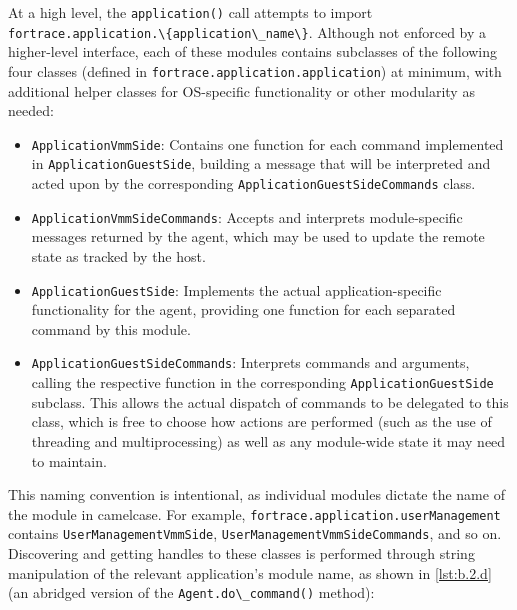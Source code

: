 \documentclass[letterpaper,12pt]{report}
\def\tightlist{}
\newcommand{\passthrough}[1]{#1}
\begin{document}
At a high level, the \passthrough{\lstinline!application()!} call
attempts to import
\passthrough{\lstinline!fortrace.application.\{application\_name\}!}.
Although not enforced by a higher-level interface, each of these modules
contains subclasses of the following four classes (defined in
\passthrough{\lstinline!fortrace.application.application!}) at minimum,
with additional helper classes for OS-specific functionality or other
modularity as needed:

\begin{itemize}
\tightlist
\item
  \passthrough{\lstinline!ApplicationVmmSide!}: Contains one function
  for each command implemented in
  \passthrough{\lstinline!ApplicationGuestSide!}, building a message
  that will be interpreted and acted upon by the corresponding
  \passthrough{\lstinline!ApplicationGuestSideCommands!} class.
\item
  \passthrough{\lstinline!ApplicationVmmSideCommands!}: Accepts and
  interprets module-specific messages returned by the agent, which may
  be used to update the remote state as tracked by the host.
\item
  \passthrough{\lstinline!ApplicationGuestSide!}: Implements the actual
  application-specific functionality for the agent, providing one
  function for each separated command by this module.
\item
  \passthrough{\lstinline!ApplicationGuestSideCommands!}: Interprets
  commands and arguments, calling the respective function in the
  corresponding \passthrough{\lstinline!ApplicationGuestSide!} subclass.
  This allows the actual dispatch of commands to be delegated to this
  class, which is free to choose how actions are performed (such as the
  use of threading and multiprocessing) as well as any module-wide state
  it may need to maintain.
\end{itemize}

This naming convention is intentional, as individual modules dictate the
name of the module in camelcase. For example,
\passthrough{\lstinline!fortrace.application.userManagement!} contains
\passthrough{\lstinline!UserManagementVmmSide!},
\passthrough{\lstinline!UserManagementVmmSideCommands!}, and so on.
Discovering and getting handles to these classes is performed through
string manipulation of the relevant application's module name, as shown
in \autoref{lst:b.2.d} (an abridged version of the
\passthrough{\lstinline!Agent.do\_command()!} method):
\end{document}
